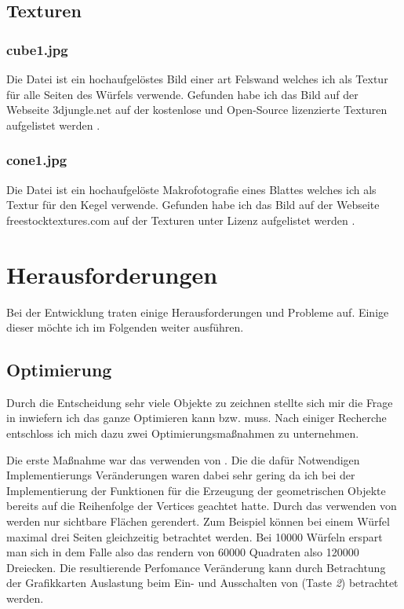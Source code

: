 \documentclass{article}
\begin{document}
\subsection{Texturen}
\subsubsection{cube1.jpg}
Die Datei  ist ein hochaufgelöstes Bild einer art Felswand welches ich als Textur für alle Seiten
des Würfels verwende. Gefunden habe ich das Bild auf der Webseite 3djungle.net auf der kostenlose und Open-Source
lizenzierte Texturen aufgelistet werden \cite{cube1}.
\subsubsection{cone1.jpg}
Die Datei  ist ein hochaufgelöste Makrofotografie eines Blattes welches ich als Textur für den
Kegel verwende. Gefunden habe ich das Bild auf der Webseite freestocktextures.com auf der
Texturen unter  Lizenz aufgelistet werden \cite{cone1}.

\section{Herausforderungen}
Bei der Entwicklung traten einige Herausforderungen und Probleme auf.
Einige dieser möchte ich im Folgenden weiter ausführen.
\subsection{Optimierung}
Durch die Entscheidung sehr viele Objekte zu zeichnen stellte sich mir die Frage in inwiefern ich das ganze
Optimieren kann bzw. muss.
Nach einiger Recherche entschloss ich mich dazu zwei Optimierungsmaßnahmen zu unternehmen.\par\medskip

Die erste Maßnahme war das verwenden von . Die die dafür Notwendigen Implementierungs Veränderungen waren 
dabei sehr gering da ich bei der Implementierung der Funktionen für die Erzeugung der geometrischen Objekte bereits
auf die Reihenfolge der Vertices geachtet hatte. Durch das verwenden von  werden nur sichtbare
Flächen gerendert. Zum Beispiel können bei einem Würfel maximal drei Seiten gleichzeitig betrachtet werden.
Bei 10000 Würfeln erspart man sich in dem Falle also das rendern von 60000 Quadraten also 120000 Dreiecken.
Die resultierende Perfomance Veränderung kann durch Betrachtung der Grafikkarten Auslastung beim
Ein- und Ausschalten von  (Taste \textit{2}) betrachtet werden.\par\medskip
\end{document}
